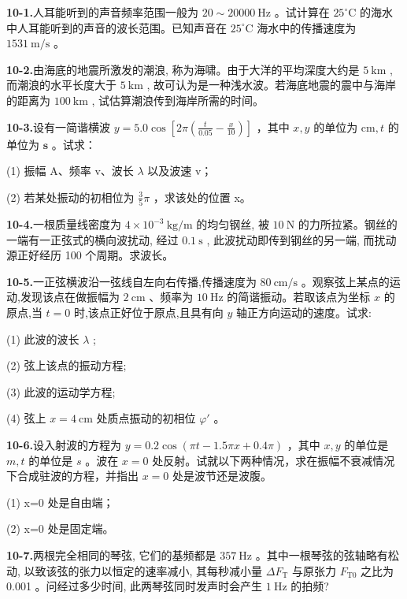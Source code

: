 \textbf{10-1.}人耳能听到的声音频率范围一般为 $20 \sim 20000 \mathrm{~Hz}$ 。试计算在 $25^{\circ} \mathrm{C}$ 的海水中人耳能听到的声音的波长范围。已知声音在 $25^{\circ} \mathrm{C}$ 海水中的传播速度为 $1531 \mathrm{~m} / \mathrm{s}$ 。

\vfill

\textbf{10-2.}由海底的地震所激发的潮浪, 称为海啸。由于大洋的平均深度大约是 $5 \mathrm{~km}$ , 而潮浪的水平长度大于 $5 \mathrm{~km}$ , 故可认为是一种浅水波。若海底地震的震中与海岸的距离为 $100 \mathrm{~km}$ , 试估算潮浪传到海岸所需的时间。

\vfill
\newpage

\textbf{10-3.}设有一简谐横波 $y = 5.0 \cos \left[2\pi \left(\frac{t}{0.05} - \frac{x}{10}\right)\right]$ ，其中 $x, y$ 的单位为 $\mathrm{cm}, t$ 的单位为 $\mathbf{s}$ 。试求：

(1) 振幅 A、频率 v、波长 $\lambda$ 以及波速 v；

(2) 若某处振动的初相位为 $\frac{3}{5}\pi$ ，求该处的位置 x。

\vfill

\textbf{10-4.}一根质量线密度为 $4 \times 10^{-3} \mathrm{~kg} / \mathrm{m}$ 的均匀钢丝, 被 $10 \mathrm{~N}$ 的力所拉紧。钢丝的一端有一正弦式的横向波扰动, 经过 $0.1 \mathrm{~s}$ , 此波扰动即传到钢丝的另一端, 而扰动源正好经历 100 个周期。求波长。

\vfill
\newpage

\textbf{10-5.}一正弦横波沿一弦线自左向右传播,传播速度为 $80 \mathrm{~cm} / \mathrm{s}$ 。观察弦上某点的运动,发现该点在做振幅为 $2 \mathrm{~cm}$ 、频率为 $10 \mathrm{~Hz}$ 的简谐振动。若取该点为坐标 $x$ 的原点,当 $t = 0$ 时,该点正好位于原点,且具有向 $y$ 轴正方向运动的速度。试求:

(1) 此波的波长 $\lambda$ ;

(2) 弦上该点的振动方程;

(3) 此波的运动学方程;

(4) 弦上 $x = 4 \mathrm{~cm}$ 处质点振动的初相位 $\varphi'$ 。

\vfill

\textbf{10-6.}设入射波的方程为 $y = 0.2\cos (\pi t - 1.5\pi x + 0.4\pi)$ ，其中 $x, y$ 的单位是 $m, t$ 的单位是 $s$ 。波在 $x = 0$ 处反射。试就以下两种情况，求在振幅不衰减情况下合成驻波的方程，并指出 $x = 0$ 处是波节还是波腹。

(1) x=0 处是自由端；

(2) x=0 处是固定端。

\vfill
\newpage

\textbf{10-7.}两根完全相同的琴弦, 它们的基频都是 $357 \mathrm{~Hz}$ 。其中一根琴弦的弦轴略有松动, 以致该弦的张力以恒定的速率减小, 其每秒减小量 $\Delta F_{\mathrm{T}}$ 与原张力 $F_{\mathrm{T} 0}$ 之比为 0.001 。问经过多少时间, 此两琴弦同时发声时会产生 $1 \mathrm{~Hz}$ 的拍频?

